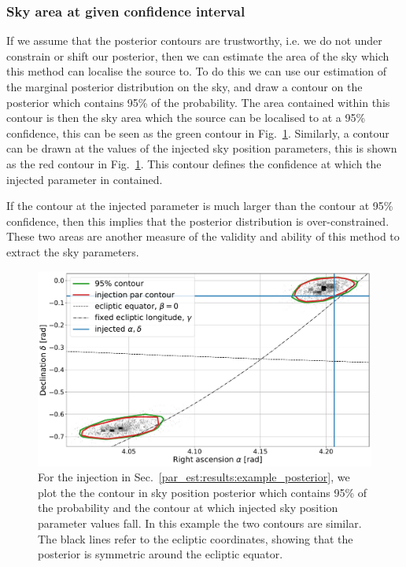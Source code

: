 \clearpage
%
%
\subsubsection{\label{par_est:results:simulations:skyarea}Sky area at given confidence interval}
%
%

If we assume that the posterior contours are trustworthy, i.e. we do not under constrain or
shift our posterior, then we can estimate the area of the sky which this method can
localise the source to.  To do this we can use our estimation of the marginal
posterior distribution on the sky, and draw a contour on the posterior which
contains 95\% of the probability.  The area contained within this contour is
then the sky area which the source can be localised to at a 95\% confidence,
this can be seen as the green contour in
Fig.~\ref{par_est:results:sky_area_example}.  Similarly, a contour can be drawn
at the values of the injected sky position parameters, this is shown as the red contour in
Fig.~\ref{par_est:results:sky_area_example}. 
This contour defines the confidence at which the injected parameter in contained.

If the contour at the injected parameter is much larger than the contour at 95\%
confidence, then this implies that the posterior distribution is over-constrained.  These two areas are another measure of the validity and ability of this
method to extract the sky parameters. 
%
\begin{figure}[ht]
    \centering
    \includegraphics[width=\linewidth]{C5_parameter/skyarea_example.pdf}
    \caption[Area of sky at 95\% confidence]{For the injection in
Sec.~\ref{par_est:results:example_posterior}, we plot the the contour in sky position
posterior which contains 95\% of the probability and the contour at which
injected sky position parameter values fall. In this example the two contours are
similar. The black lines refer to the ecliptic coordinates, showing that the posterior is symmetric around the ecliptic equator.} \label{par_est:results:sky_area_example}
\end{figure}

